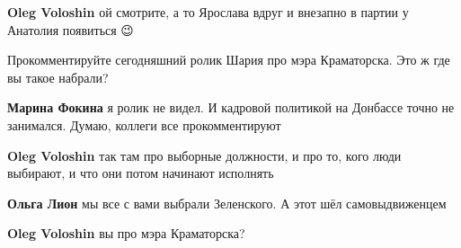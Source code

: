 \begin{itemize}
\begin{itemize}
\textbf{Oleg Voloshin} ой смотрите, а то Ярослава вдруг и внезапно в партии у Анатолия появиться 😉
\end{itemize}

 
Прокомментируйте сегодняшний ролик Шария про мэра Краматорска. Это ж где вы такое набрали?

\begin{itemize}
 
\textbf{Марина Фокина} я ролик не видел. И кадровой политикой на Донбассе точно не занимался. Думаю, коллеги все прокомментируют

 
\textbf{Oleg Voloshin} так там про выборные должности, и про то, кого люди выбирают, и что они потом начинают исполнять

 
\textbf{Ольга Лион} мы все с вами выбрали Зеленского. А этот шёл самовыдвиженцем

 
\textbf{Oleg Voloshin} вы про мэра Краматорска?

 

\end{itemize}
\end{itemize}
